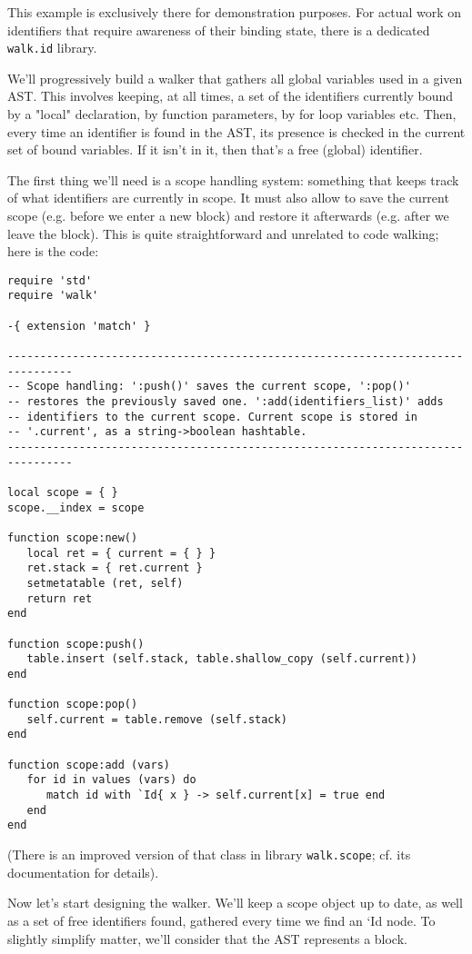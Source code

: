 This example is exclusively there for demonstration purposes. For actual
work on identifiers that require awareness of their binding state, there
is a dedicated {\tt walk.id} library.

We'll progressively build a walker that gathers all global variables
used in a given AST. This involves keeping, at all times, a set of
the identifiers currently bound by a "local" declaration, by function
parameters, by for loop variables etc. Then, every time an identifier is
found in the AST, its presence is checked in the current set of bound
variables. If it isn't in it, then that's a free (global) identifier.

The first thing we'll need is a scope handling system: something that keeps
track of what identifiers are currently in scope. It must also allow to save the
current scope (e.g. before we enter a new block) and restore it afterwards (e.g.
after we leave the block). This is quite straightforward and unrelated to code
walking; here is the code:

\begin{Verbatim}[fontsize=\scriptsize]
require 'std'
require 'walk'

-{ extension 'match' }

--------------------------------------------------------------------------------
-- Scope handling: ':push()' saves the current scope, ':pop()'
-- restores the previously saved one. ':add(identifiers_list)' adds
-- identifiers to the current scope. Current scope is stored in
-- '.current', as a string->boolean hashtable.
--------------------------------------------------------------------------------

local scope = { }
scope.__index = scope

function scope:new()
   local ret = { current = { } }
   ret.stack = { ret.current }
   setmetatable (ret, self)
   return ret
end

function scope:push()
   table.insert (self.stack, table.shallow_copy (self.current))
end

function scope:pop()
   self.current = table.remove (self.stack)
end

function scope:add (vars)
   for id in values (vars) do
      match id with `Id{ x } -> self.current[x] = true end
   end
end
\end{Verbatim}

(There is an improved version of that class in library {\tt walk.scope}; cf.
its documentation for details).

Now let's start designing the walker. We'll keep a scope object up to date, as
well as a set of free identifiers found, gathered every time we find an `Id{ }
node. To slightly simplify matter, we'll consider that the AST represents a
block.


